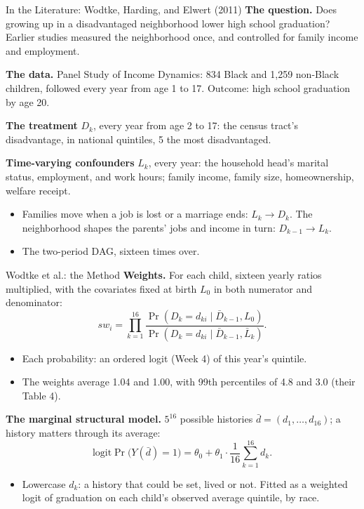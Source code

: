 \documentclass[aspectratio=169,11pt,xcolor=dvipsnames]{beamer}
\newcommand{\srcp}[1]{{\scriptsize\color{gray}(#1)}}
\begin{document}
\begin{frame}{In the Literature: Wodtke, Harding, and Elwert (2011)}
\textbf{The question.} Does growing up in a disadvantaged neighborhood lower high school
graduation? Earlier studies measured the neighborhood once, and controlled for family income and
employment.
\par\vskip3pt
\textbf{The data.} Panel Study of Income Dynamics: 834 Black and 1,259 non-Black children, followed
every year from age 1 to 17. Outcome: high school graduation by age 20.
\par\vskip2pt
\textbf{The treatment} $D_k$, every year from age 2 to 17: the census tract's disadvantage, in
national quintiles, 5 the most disadvantaged.
\par\vskip3pt
\textbf{Time-varying confounders} $L_k$, every year: the household head's marital status,
employment, and work hours; family income, family size, homeownership, welfare receipt.
\begin{itemize}\itemsep2pt
  \item Families move when a job is lost or a marriage ends: $L_k \to D_k$. The neighborhood
        shapes the parents' jobs and income in turn: $D_{k-1} \to L_k$.
  \item The two-period DAG, sixteen times over.
\end{itemize}
\end{frame}

\begin{frame}{Wodtke et al.: the Method}
\textbf{Weights.} For each child, sixteen yearly ratios multiplied, with the covariates fixed at
birth $L_0$ in both numerator and denominator:
\[ sw_i = \prod_{k=1}^{16}
   \frac{\Pr(D_k = d_{ki} \mid \bar D_{k-1}, L_0)}{\Pr(D_k = d_{ki} \mid \bar D_{k-1}, \bar L_k)} . \]
\vskip-4pt
\begin{itemize}\itemsep3pt
  \item Each probability: an ordered logit (Week 4) of this year's quintile.
  \item The weights average 1.04 and 1.00, with 99th percentiles of 4.8 and 3.0
        \srcp{their Table 4}.
\end{itemize}
\textbf{The marginal structural model.} $5^{16}$ possible histories
$\bar d = (d_1, \dots, d_{16})$; a history matters through its average:
\[ \text{logit} \Pr\big(Y(\bar d) = 1\big) = \theta_0 + \theta_1 \cdot \frac{1}{16} \sum_{k=1}^{16} d_k . \]
\vskip-4pt
\begin{itemize}\itemsep3pt
  \item Lowercase $d_k$: a history that could be set, lived or not. Fitted as a weighted logit of
        graduation on each child's observed average quintile, by race.
\end{itemize}
\end{frame}
\end{document}
